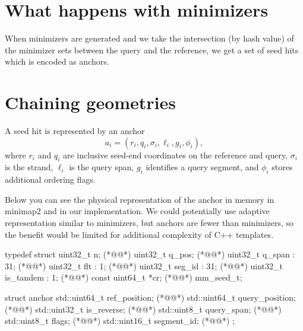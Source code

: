 \section{What happens with minimizers}
\label{sec:chaining-purpose}

When minimizers are generated and we take the intersection (by hash value) of the minimizer sets between the query and the reference, we get a set of seed hits which is encoded as anchors.

\section{Chaining geometries}
\label{sec:chaining-geometry}

A seed hit is represented by an anchor
\[
  a_i=(r_i,q_i,\sigma_i,\ell_i,g_i,\phi_i),
\]
where \(r_i\) and \(q_i\) are inclusive seed-end coordinates on the reference
and query, \(\sigma_i\) is the strand, \(\ell_i\) is the query span, \(g_i\)
identifies a query segment, and \(\phi_i\) stores additional ordering flags.

Below you can see the physical representation of the anchor in memory in minimap2 and in our implementation. We could potentially use adaptive representation similar to minimizers, but anchors are fewer than minimizers, so the benefit would be limited for additional complexity of C++ templates.

\begin{BioseqCppSnippet}
  typedef struct {
    uint32_t n;                    (*@@*)
    uint32_t q_pos;                (*@@*)
    uint32_t q_span       : 31;    (*@@*)
    uint32_t flt          : 1;     (*@@*)
    uint32_t seg_id       : 31;    (*@@*)
    uint32_t is_tandem    : 1;     (*@@*)
    const uint64_t *cr;            (*@@*)
  } mm_seed_t;
\end{BioseqCppSnippet}
\begin{BioseqCppSnippet}
  struct anchor {
    std::uint64_t ref_position;    (*@@*)
    std::uint64_t query_position;  (*@@*)
    std::uint32_t is_reverse;      (*@@*)
    std::uint8_t query_span;       (*@@*)
    std::uint8_t flags;            (*@@*)
    std::uint16_t segment_id;      (*@@*)
  };
\end{BioseqCppSnippet}

